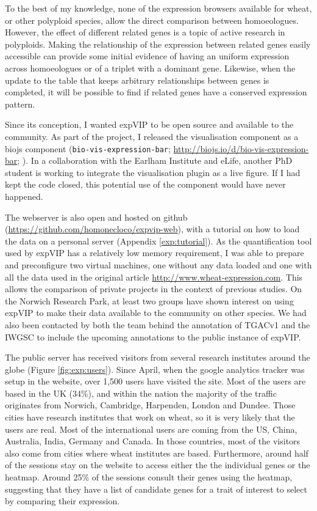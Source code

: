 To the best of my knowledge, none of the expression browsers available for wheat, or other polyploid species, allow the direct comparison between homoeologues. However, the effect of different related genes is a topic of active research in polyploids. 
Making the relationship of the expression between related genes easily accessible can provide some initial evidence of having an uniform expression across homoeologues or of a triplet with a dominant gene. 
Likewise, when the update to the table that keeps arbitrary relationships between genes is completed, it will be possible to find if related genes have a conserved expression pattern. 

Since its conception, I wanted expVIP to be open source and available to the community. 
As part of the project, I released the visualisation component as a biojs component  (\texttt{bio-vis-expression-bar}; \url{http://biojs.io/d/bio-vis-expression-bar}; \citealt{Yachdav2015}).
In a collaboration with the Earlham Institute and eLife, another PhD student is working to integrate the visualisation plugin as a live figure. 
If I had kept the code closed, this potential use of the component would have never happened. 

The webserver is also open and hosted on github (\url{https://github.com/homonecloco/expvip-web}), with a tutorial on how to load the data on a personal server (Appendix \ref{exp:tutorial}). 
As the quantification tool used by expVIP has a relatively low memory requirement, I was able to prepare and preconfigure two virtual machines, one without any data loaded and one with all the data used in the original article \url{http://www.wheat-expression.com}. 
This allows the comparison of private projects in the context of previous studies. 
On the Norwich Research Park, at least two groups have shown interest on using expVIP to make their data available to the community on other species.
We had also been contacted by both the team behind the annotation of TGACv1 and the IWGSC to include the upcoming annotations to the public instance of expVIP. 

The public server has received visitors from several research institutes around the globe (Figure \ref{fig:exp:users}). 
Since April, when the google analytics tracker was setup in the website, over 1,500 users have visited the site. 
Most of the users are based in the UK (34\%), and within the nation the majority of the traffic originates from Norwich, Cambridge, Harpenden, London and Dundee. 
Those cities have research institutes that work on wheat, so it is very likely that the users are real. 
Most of the international users are coming from the US, China, Australia, India, Germany and Canada. 
In those countries, most of the visitors also come from cities where wheat institutes are based. 
Furthermore, around half of the sessions stay on the website to access either the the individual genes or the heatmap. 
Around 25\% of the sessions consult their genes using the heatmap, suggesting that they have a list of candidate genes for a trait of interest to select by comparing their expression.


